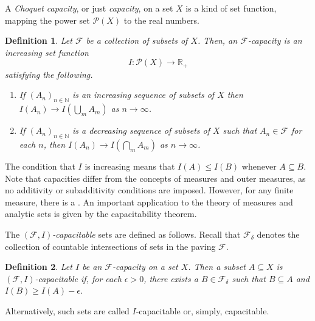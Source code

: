 \documentclass[12pt]{article}
\newtheorem*{definition*}{Definition}
\begin{document}

A \emph{Choquet capacity}, or just \emph{capacity}, on a set $X$ is a kind of set function, mapping the power set $\mathcal{P}(X)$ to the real numbers.

\begin{definition*}
Let $\mathcal{F}$ be a collection of subsets of $X$. Then, an $\mathcal{F}$-capacity is an increasing set function
\begin{equation*}
I\colon\mathcal{P}(X)\rightarrow\mathbb{R}_+
\end{equation*}
satisfying the following.
\begin{enumerate}
\item If $(A_n)_{n\in\mathbb{N}}$ is an increasing sequence of subsets of $X$ then $I(A_n)\rightarrow I\left(\bigcup_mA_m\right)$ as $n\rightarrow\infty$.
\item If $(A_n)_{n\in\mathbb{N}}$ is a decreasing sequence of subsets of $X$ such that $A_n\in\mathcal{F}$ for each $n$, then $I(A_n)\rightarrow I\left(\bigcap_mA_m\right)$ as $n\rightarrow\infty$.
\end{enumerate}
\end{definition*}
The condition that $I$ is increasing means that $I(A)\le I(B)$ whenever $A\subseteq B$.
Note that capacities differ from the concepts of measures and outer measures, as no additivity or subadditivity conditions are imposed. However, for any finite measure, there is a . An important application to the theory of measures and analytic sets is given by the capacitability theorem.

The \emph{$(\mathcal{F},I)$-capacitable} sets are defined as follows. Recall that $\mathcal{F}_\delta$ denotes the collection of countable intersections of sets in the paving $\mathcal{F}$.

\begin{definition*}
Let $I$ be an $\mathcal{F}$-capacity on a set $X$. Then a subset $A\subseteq X$ is \emph{$(\mathcal{F},I)$-capacitable} if, for each $\epsilon >0$, there exists a $B\in\mathcal{F}_\delta$ such that $B\subseteq A$ and $I(B)\ge I(A)-\epsilon$.
\end{definition*}
Alternatively, such sets are called $I$-capacitable or, simply, capacitable.

\end{document}
